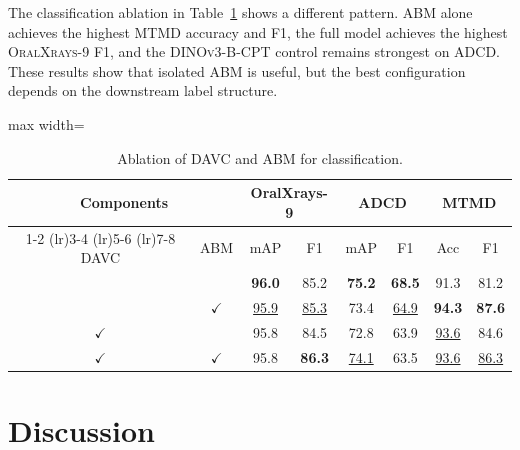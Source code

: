 \documentclass[conference]{IEEEtran}
\newcommand{\DCT}{\textsc{DINOv3-B-CPT}}
\newcommand{\DAVC}{\textsc{DAVC}}
\newcommand{\ABM}{\textsc{ABM}}
\newcommand{\cmark}{\ensuremath{\checkmark}}
\newcommand{\dataset}[1]{\textsc{#1}}
\newcommand{\best}[1]{\textbf{#1}}
\newcommand{\second}[1]{\underline{#1}}
\begin{document}
The classification ablation in Table~\ref{tab:classification-ablation} shows a different pattern. \ABM{} alone achieves the highest \dataset{MTMD} accuracy and F1, the full model achieves the highest \dataset{OralXrays-9} F1, and the \DCT{} control remains strongest on \dataset{ADCD}. These results show that isolated \ABM{} is useful, but the best configuration depends on the downstream label structure.

\begin{table}[t]
  \centering
  \scriptsize
  \setlength{\tabcolsep}{3.0pt}
  \caption{Ablation of \DAVC{} and \ABM{} for classification.}
  \label{tab:classification-ablation}
  \begin{threeparttable}
  \begin{adjustbox}{max width=\columnwidth}
  \begin{tabular}{cc*{6}{c}}
    \toprule
    \multicolumn{2}{c}{\textbf{Components}}
    & \multicolumn{2}{c}{OralXrays-9}
    & \multicolumn{2}{c}{ADCD}
    & \multicolumn{2}{c}{MTMD} \\
    \cmidrule(lr){1-2}
    \cmidrule(lr){3-4}
    \cmidrule(lr){5-6}
    \cmidrule(lr){7-8}
    \DAVC{} & \ABM{} & mAP & F1 & mAP & F1 & Acc & F1 \\
    \midrule
     &  & \best{96.0} & 85.2 & \best{75.2} & \best{68.5} & 91.3 & 81.2 \\
     & \cmark & \second{95.9} & \second{85.3} & 73.4 & \second{64.9} & \best{94.3} & \best{87.6} \\
    \cmark &  & 95.8 & 84.5 & 72.8 & 63.9 & \second{93.6} & 84.6 \\
    \cmark & \cmark & 95.8 & \best{86.3} & \second{74.1} & 63.5 & \second{93.6} & \second{86.3} \\
    \bottomrule
  \end{tabular}
  \end{adjustbox}
  \end{threeparttable}
\end{table}

\section{Discussion}
\label{sec:discussion}
\end{document}

